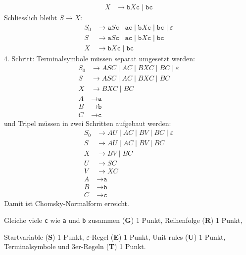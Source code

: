 \begin{loesung}
\begin{teilaufgaben}
\begin{align*}
\\
X & \to \texttt{b}X\texttt{c} \;|\; \texttt{bc}
\end{align*}
Schliesslich bleibt $S\to X$:
\begin{align*}
S_0 & \to
\texttt{a} S \texttt{c} \;|\; \texttt{ac} \;|\;
\texttt{b}X\texttt{c} \;|\; \texttt{bc}
\;|\; \varepsilon
\\
S & \to
\texttt{a} S \texttt{c} \;|\; \texttt{ac} \;|\;
\texttt{b}X\texttt{c} \;|\; \texttt{bc}
\\
X & \to \texttt{b}X\texttt{c} \;|\; \texttt{bc}
\end{align*}
4. Schritt: Terminalsymbole müssen separat umgesetzt werden:
\begin{align*}
S_0 & \to
ASC \;|\; AC \;|\;
BXC \;|\; BC
\;|\; \varepsilon
\\
S & \to
A S C \;|\; AC \;|\;
BXC \;|\; BC
\\
X & \to BXC \;|\; BC
\\
A&\to \texttt{a} \\
B&\to \texttt{b} \\
C&\to \texttt{c}
\end{align*}
und Tripel müssen in zwei Schritten aufgebaut werden:
\begin{align*}
S_0 & \to AU \;|\; AC \;|\; BV \;|\; BC \;|\; \varepsilon
\\
S & \to AU \;|\; AC \;|\; BV \;|\; BC
\\
X & \to BV \;|\; BC
\\
U&\to SC
\\
V & \to XC
\\
A&\to \texttt{a} \\
B&\to \texttt{b} \\
C&\to \texttt{c}
\end{align*}
Damit ist Chomsky-Normalform erreicht.
\qedhere
\end{teilaufgaben}
\end{loesung}

\begin{bewertung}
\begin{teilaufgaben}
\item Gleiche viele \texttt{c} wie \texttt{a} und \texttt{b} zusammen
({\bf G}) 1 Punkt,
Reihenfolge ({\bf R}) 1 Punkt,
\item Startvariable ({\bf S}) 1 Punkt,
$\varepsilon$-Regel ({\bf E}) 1 Punkt,
Unit rules ({\bf U}) 1 Punkt,
Terminalsymbole und 3er-Regeln ({\bf T}) 1 Punkt.
\end{teilaufgaben}
\end{bewertung}
